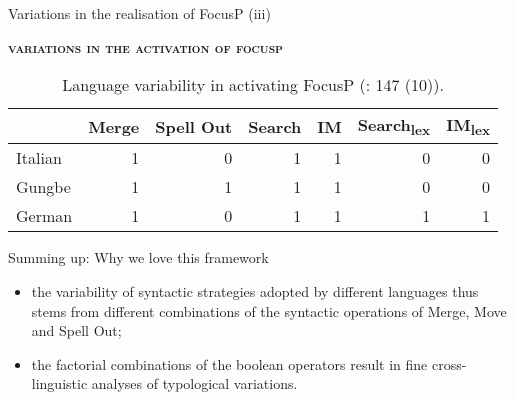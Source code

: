 \documentclass[lesson_slides]{subfiles}
\begin{document}
\begin{frame}[c]{Variations in the realisation of FocusP (iii)}

    \noindent \textbf{\textsc{variations in the activation of focusp}} 
    \begin{table}[H]
    \centering
        \begin{tabular}{|l|r|r|r|r|r|r|}
        \hline
         & Merge & Spell Out & Search & IM & Search\textsubscript{lex} & IM\textsubscript{lex} \\
        \hline
        Italian & 1 & 0 & 1 & 1 & 0 & 0 \\
        \hline
        Gungbe & 1 & 1 & 1 & 1 & 0 & 0 \\
        \hline
        German & 1 & 0 & 1 & 1 & 1 & 1 \\
        \hline
        \end{tabular}
    \caption{\label{tab:samp}Language variability in activating FocusP (\citealt{samo2019cartography}: 147 (10)).}
    \end{table}

\end{frame}
\begin{frame}{Summing up: Why we love this framework}

    \begin{itemize}
        \item[\ding{227}] the variability of syntactic strategies adopted by different languages thus stems from different combinations of the syntactic operations of Merge, Move and Spell Out; \pause
        \item[\ding{227}] the factorial combinations of the boolean operators result in fine cross-linguistic analyses of typological variations. 
    \end{itemize}
    
\end{frame}
\end{document}
